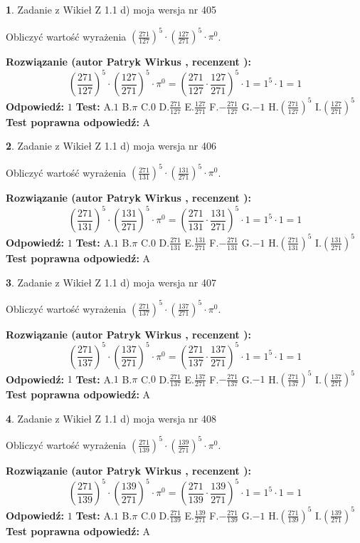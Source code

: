 \documentclass[12pt, a4paper]{article}
\theoremstyle{definition} %
\newtheorem{zad}{}
\newcommand{\zadStart}[1]{\begin{zad}#1\newline}
\newcommand{\zadStop}{\end{zad}}
\newcommand{\rozwStart}[2]{\noindent \textbf{Rozwiązanie (autor #1 , recenzent #2): }\newline}
\newcommand{\rozwStop}{\newline}
\newcommand{\odpStart}{\noindent \textbf{Odpowiedź:}\newline}
\newcommand{\odpStop}{\newline}
\newcommand{\testStart}{\noindent \textbf{Test:}\newline}
\newcommand{\testStop}{\newline}
\newcommand{\kluczStart}{\noindent \textbf{Test poprawna odpowiedź:}\newline}
\newcommand{\kluczStop}{\newline}
\begin{document}
\zadStart{Zadanie z Wikieł Z 1.1 d) moja wersja nr 405}

Obliczyć wartość wyrażenia $(\frac{271}{127})^{5} \cdot (\frac{127}{271})^{5} \cdot \pi^{0}$.
\zadStop
\rozwStart{Patryk Wirkus}{}
$$(\frac{271}{127})^{5} \cdot (\frac{127}{271})^{5} \cdot \pi^{0} = (\frac{271}{127} \cdot \frac{127}{271})^{5} \cdot 1 = 1^{5} \cdot 1 = 1$$
\rozwStop
\odpStart
$1$
\odpStop
\testStart
A.$1$ B.$\pi$ C.$0$ D.$\frac{271}{127}$ E.$\frac{127}{271}$
F.$-\frac{271}{127}$ G.$-1$
H.$(\frac{271}{127})^{5}$
I.$(\frac{127}{271})^{5}$
\testStop
\kluczStart
A
\kluczStop



\zadStart{Zadanie z Wikieł Z 1.1 d) moja wersja nr 406}

Obliczyć wartość wyrażenia $(\frac{271}{131})^{5} \cdot (\frac{131}{271})^{5} \cdot \pi^{0}$.
\zadStop
\rozwStart{Patryk Wirkus}{}
$$(\frac{271}{131})^{5} \cdot (\frac{131}{271})^{5} \cdot \pi^{0} = (\frac{271}{131} \cdot \frac{131}{271})^{5} \cdot 1 = 1^{5} \cdot 1 = 1$$
\rozwStop
\odpStart
$1$
\odpStop
\testStart
A.$1$ B.$\pi$ C.$0$ D.$\frac{271}{131}$ E.$\frac{131}{271}$
F.$-\frac{271}{131}$ G.$-1$
H.$(\frac{271}{131})^{5}$
I.$(\frac{131}{271})^{5}$
\testStop
\kluczStart
A
\kluczStop



\zadStart{Zadanie z Wikieł Z 1.1 d) moja wersja nr 407}

Obliczyć wartość wyrażenia $(\frac{271}{137})^{5} \cdot (\frac{137}{271})^{5} \cdot \pi^{0}$.
\zadStop
\rozwStart{Patryk Wirkus}{}
$$(\frac{271}{137})^{5} \cdot (\frac{137}{271})^{5} \cdot \pi^{0} = (\frac{271}{137} \cdot \frac{137}{271})^{5} \cdot 1 = 1^{5} \cdot 1 = 1$$
\rozwStop
\odpStart
$1$
\odpStop
\testStart
A.$1$ B.$\pi$ C.$0$ D.$\frac{271}{137}$ E.$\frac{137}{271}$
F.$-\frac{271}{137}$ G.$-1$
H.$(\frac{271}{137})^{5}$
I.$(\frac{137}{271})^{5}$
\testStop
\kluczStart
A
\kluczStop



\zadStart{Zadanie z Wikieł Z 1.1 d) moja wersja nr 408}

Obliczyć wartość wyrażenia $(\frac{271}{139})^{5} \cdot (\frac{139}{271})^{5} \cdot \pi^{0}$.
\zadStop
\rozwStart{Patryk Wirkus}{}
$$(\frac{271}{139})^{5} \cdot (\frac{139}{271})^{5} \cdot \pi^{0} = (\frac{271}{139} \cdot \frac{139}{271})^{5} \cdot 1 = 1^{5} \cdot 1 = 1$$
\rozwStop
\odpStart
$1$
\odpStop
\testStart
A.$1$ B.$\pi$ C.$0$ D.$\frac{271}{139}$ E.$\frac{139}{271}$
F.$-\frac{271}{139}$ G.$-1$
H.$(\frac{271}{139})^{5}$
I.$(\frac{139}{271})^{5}$
\testStop
\kluczStart
A
\kluczStop
\end{document}
